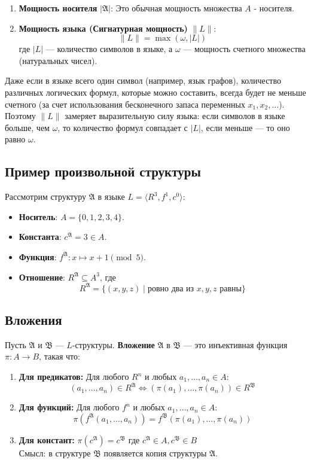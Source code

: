 \documentclass[12pt,a4paper,oneside,openany]{book}
\theoremstyle{definition}
\theoremstyle{plain}
\theoremstyle{remark}
\begin{document}
\begin{enumerate}
    \item \textbf{Мощность носителя} $|\mathfrak{A}|$: Это обычная мощность множества $A$ - носителя.
    \item \textbf{Мощность языка (Сигнатурная мощность)} $\|L\|$:
    \[ \|L\| = \max(\omega, |L|) \]
    где $|L|$ — количество символов в языке, а $\omega$  — мощность счетного множества (натуральных чисел).
\end{enumerate}


Даже если в языке всего один символ (например, язык графов), количество различных логических формул, которые можно составить, всегда будет не меньше счетного (за счет использования бесконечного запаса переменных $x_1, x_2, \dots$). Поэтому $\|L\|$ замеряет выразительную силу языка: если символов в языке больше, чем $\omega$, то количество формул совпадает с $|L|$, если меньше — то оно равно $\omega$.

\subsection{Пример произвольной структуры}
Рассмотрим структуру $\mathfrak{A}$ в языке $L = \langle R^3, f^1, c^0 \rangle$:
\begin{itemize}
    \item \textbf{Носитель}: $A = \{0, 1, 2, 3, 4\}$.
    \item \textbf{Константа}: $c^{\mathfrak{A}} = 3 \in A$.
    \item \textbf{Функция}: $f^{\mathfrak{A}}: x \mapsto x + 1 \pmod{5}$.
    \item \textbf{Отношение}: $R^{\mathfrak{A}} \subseteq A^3$, где
    \[ R^{\mathfrak{A}} = \{ (x, y, z) \mid \text{ровно два из } x, y, z \text{ равны} \} \]
\end{itemize}

\subsection{Вложения}

Пусть $\mathfrak{A}$ и $\mathfrak{B}$ — $L$-структуры. 
\textbf{Вложение} $\mathfrak{A}$ в $\mathfrak{B}$ — это инъективная функция $\pi: A \to B$, такая что:

\begin{enumerate}
    \item \textbf{Для предикатов:} Для любого $R^n$ и любых $a_1, \dots, a_n \in A$:
    \[ (a_1, \dots, a_n) \in R^{\mathfrak{A}} \iff (\pi(a_1), \dots, \pi(a_n)) \in R^{\mathfrak{B}} \]
    \item \textbf{Для функций:} Для любого $f^n$ и любых $a_1, \dots, a_n \in A$:
    \[ \pi(f^{\mathfrak{A}}(a_1, \dots, a_n)) = f^{\mathfrak{B}}(\pi(a_1), \dots, \pi(a_n)) \]
    \item \textbf{Для констант:} $\pi(c^{\mathfrak{A}}) = c^{\mathfrak{B}}$ где $c^{\mathfrak{A}} \in A,  c^{\mathfrak{B}} \in B$ \\
    Смысл: в структуре $\mathfrak{B}$ появляется копия структуры $\mathfrak{A}$.
\end{enumerate}
\end{document}
